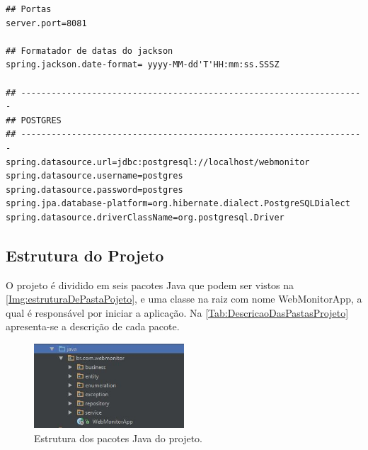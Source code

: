 \begin{lstlisting}[style=LIVRE, label=Func:applicationProperties,caption={[Arquivo application.properties com as principais configurações do projeto.]Arquivo application.properties com as principais configurações do projeto.}]
## Portas
server.port=8081

## Formatador de datas do jackson
spring.jackson.date-format= yyyy-MM-dd'T'HH:mm:ss.SSSZ

## --------------------------------------------------------------------
## POSTGRES
## --------------------------------------------------------------------
spring.datasource.url=jdbc:postgresql://localhost/webmonitor
spring.datasource.username=postgres
spring.datasource.password=postgres
spring.jpa.database-platform=org.hibernate.dialect.PostgreSQLDialect
spring.datasource.driverClassName=org.postgresql.Driver

\end{lstlisting}


\subsection{Estrutura do Projeto}\label{subsec:EstruturaDoProjeto}

O projeto é dividido em seis pacotes Java que podem ser vistos na \autoref{Img:estruturaDePastaPojeto}, e uma classe na raiz com nome WebMonitorApp, a qual é responsável por iniciar a aplicação. Na \autoref{Tab:DescricaoDasPastasProjeto} apresenta-se a descrição de cada pacote.

\begin{figure}[H]
	\centering
	\includegraphics[width=0.5\textwidth]{figuras/estruturaPojeto.JPG}
	\caption[Estrutura dos pacotes Java do projeto.]{Estrutura dos pacotes Java do projeto.}
	\label{Img:estruturaDePastaPojeto}
\end{figure}
	

